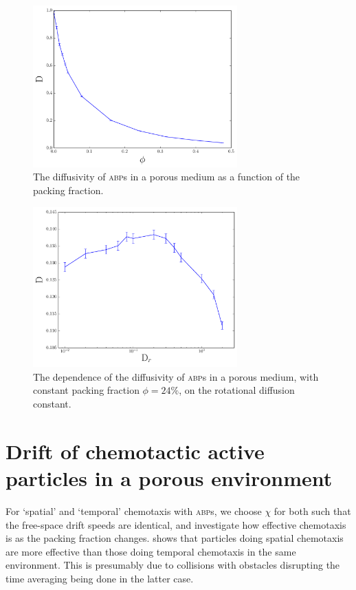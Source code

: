 \documentclass[a4wide,11pt]{article}
\begin{document}
\begin{figure}
    \centering
    \includegraphics[width=0.7\textwidth]{img/D_of_packing.pdf}
    \caption{The diffusivity of \textsc{abp}s in a porous medium as a function of the packing fraction.}
    \label{D_of_packing}
\end{figure}

\begin{figure}
    \centering
    \includegraphics[width=0.7\textwidth]{img/packed_D_of_Dr.pdf}
    \caption{The dependence of the diffusivity of \textsc{abp}s in a porous medium, with constant packing fraction $\phi=24\%$, on the rotational diffusion constant.}
    \label{packed_D_of_Dr}
\end{figure}

\section{Drift of chemotactic active particles in a porous environment}

For `spatial' and `temporal' chemotaxis with \textsc{abp}s, we choose $\chi$ for both such that the free-space drift speeds are identical, and investigate how effective chemotaxis is as the packing fraction changes.  shows that particles doing spatial chemotaxis are more effective than those doing temporal chemotaxis in the same environment. This is presumably due to collisions with obstacles disrupting the time averaging being done in the latter case.
\end{document}
